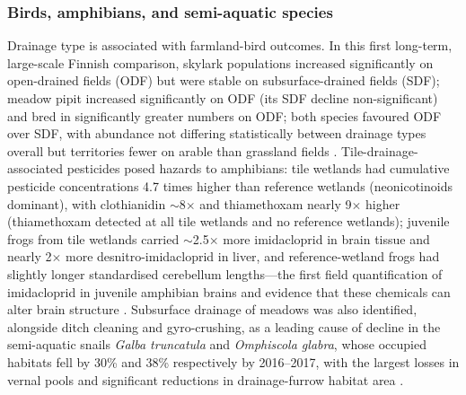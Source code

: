 \documentclass[11pt]{article}
\begin{document}
\subsubsection{Birds, amphibians, and semi-aquatic species}
Drainage type is associated with farmland-bird outcomes. In this first long-term, large-scale Finnish comparison, skylark populations increased significantly on open-drained fields (ODF) but were stable on subsurface-drained fields (SDF); meadow pipit increased significantly on ODF (its SDF decline non-significant) and bred in significantly greater numbers on ODF; both species favoured ODF over SDF, with abundance not differing statistically between drainage types overall but territories fewer on arable than grassland fields \parencite{Marja2013}. Tile-drainage-associated pesticides posed hazards to amphibians: tile wetlands had cumulative pesticide concentrations 4.7 times higher than reference wetlands (neonicotinoids dominant), with clothianidin $\sim$8$\times$ and thiamethoxam nearly 9$\times$ higher (thiamethoxam detected at all tile wetlands and no reference wetlands); juvenile frogs from tile wetlands carried $\sim$2.5$\times$ more imidacloprid in brain tissue and nearly 2$\times$ more desnitro-imidacloprid in liver, and reference-wetland frogs had slightly longer standardised cerebellum lengths---the first field quantification of imidacloprid in juvenile amphibian brains and evidence that these chemicals can alter brain structure \parencite{Campbell2023}. Subsurface drainage of meadows was also identified, alongside ditch cleaning and gyro-crushing, as a leading cause of decline in the semi-aquatic snails \textit{Galba truncatula} and \textit{Omphiscola glabra}, whose occupied habitats fell by 30\% and 38\% respectively by 2016--2017, with the largest losses in vernal pools and significant reductions in drainage-furrow habitat area \parencite{Dreyfuss2018}.
\end{document}

